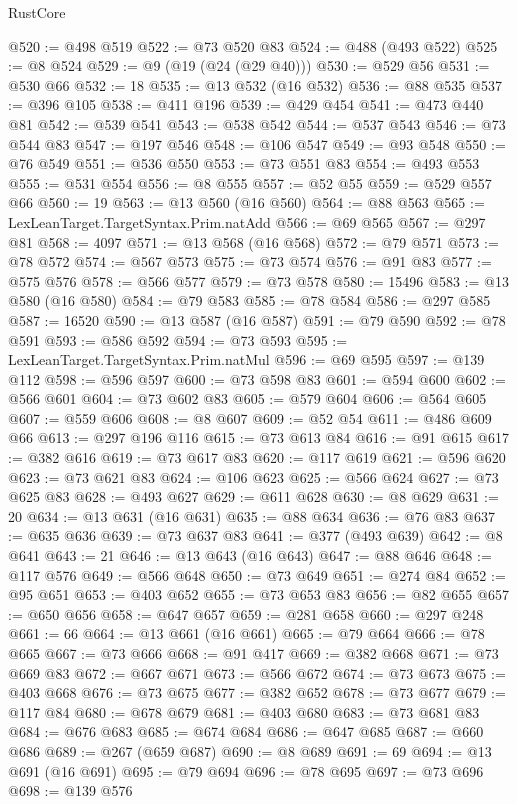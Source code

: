 \begin{lexlean}{RustCore}
\begin{coremodule}
@520 := @498 @519
@522 := @73 @520 @83
@524 := @488 (@493 @522)
@525 := @8 @524
@529 := @9 (@19 (@24 (@29 @40)))
@530 := @529 @56
@531 := @530 @66
@532 := 18
@535 := @13 @532 (@16 @532)
@536 := @88 @535
@537 := @396 @105
@538 := @411 @196
@539 := @429 @454
@541 := @473 @440 @81
@542 := @539 @541
@543 := @538 @542
@544 := @537 @543
@546 := @73 @544 @83
@547 := @197 @546
@548 := @106 @547
@549 := @93 @548
@550 := @76 @549
@551 := @536 @550
@553 := @73 @551 @83
@554 := @493 @553
@555 := @531 @554
@556 := @8 @555
@557 := @52 @55
@559 := @529 @557 @66
@560 := 19
@563 := @13 @560 (@16 @560)
@564 := @88 @563
@565 := LexLeanTarget.TargetSyntax.Prim.natAdd
@566 := @69 @565
@567 := @297 @81
@568 := 4097
@571 := @13 @568 (@16 @568)
@572 := @79 @571
@573 := @78 @572
@574 := @567 @573
@575 := @73 @574
@576 := @91 @83
@577 := @575 @576
@578 := @566 @577
@579 := @73 @578
@580 := 15496
@583 := @13 @580 (@16 @580)
@584 := @79 @583
@585 := @78 @584
@586 := @297 @585
@587 := 16520
@590 := @13 @587 (@16 @587)
@591 := @79 @590
@592 := @78 @591
@593 := @586 @592
@594 := @73 @593
@595 := LexLeanTarget.TargetSyntax.Prim.natMul
@596 := @69 @595
@597 := @139 @112
@598 := @596 @597
@600 := @73 @598 @83
@601 := @594 @600
@602 := @566 @601
@604 := @73 @602 @83
@605 := @579 @604
@606 := @564 @605
@607 := @559 @606
@608 := @8 @607
@609 := @52 @54
@611 := @486 @609 @66
@613 := @297 @196 @116
@615 := @73 @613 @84
@616 := @91 @615
@617 := @382 @616
@619 := @73 @617 @83
@620 := @117 @619
@621 := @596 @620
@623 := @73 @621 @83
@624 := @106 @623
@625 := @566 @624
@627 := @73 @625 @83
@628 := @493 @627
@629 := @611 @628
@630 := @8 @629
@631 := 20
@634 := @13 @631 (@16 @631)
@635 := @88 @634
@636 := @76 @83
@637 := @635 @636
@639 := @73 @637 @83
@641 := @377 (@493 @639)
@642 := @8 @641
@643 := 21
@646 := @13 @643 (@16 @643)
@647 := @88 @646
@648 := @117 @576
@649 := @566 @648
@650 := @73 @649
@651 := @274 @84
@652 := @95 @651
@653 := @403 @652
@655 := @73 @653 @83
@656 := @82 @655
@657 := @650 @656
@658 := @647 @657
@659 := @281 @658
@660 := @297 @248
@661 := 66
@664 := @13 @661 (@16 @661)
@665 := @79 @664
@666 := @78 @665
@667 := @73 @666
@668 := @91 @417
@669 := @382 @668
@671 := @73 @669 @83
@672 := @667 @671
@673 := @566 @672
@674 := @73 @673
@675 := @403 @668
@676 := @73 @675
@677 := @382 @652
@678 := @73 @677
@679 := @117 @84
@680 := @678 @679
@681 := @403 @680
@683 := @73 @681 @83
@684 := @676 @683
@685 := @674 @684
@686 := @647 @685
@687 := @660 @686
@689 := @267 (@659 @687)
@690 := @8 @689
@691 := 69
@694 := @13 @691 (@16 @691)
@695 := @79 @694
@696 := @78 @695
@697 := @73 @696
@698 := @139 @576

\end{coremodule}
\end{lexlean}
